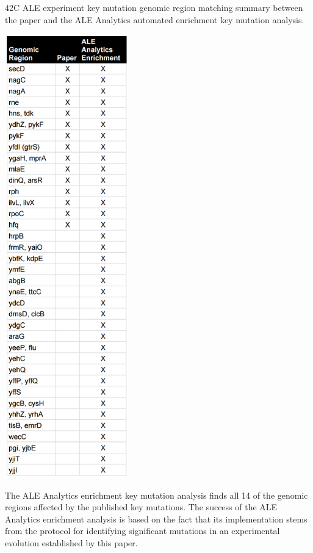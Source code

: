 \documentclass[12pt,final,masters,chapterheads]{ucsd}  %
\begin{document}
\begin{table}[H]
  \caption{42C ALE experiment {key mutation} genomic region matching summary between the paper and the ALE Analytics automated {enrichment key mutation} analysis.}
  \centering
  \includegraphics[width=0.4\textwidth]{42c_key_mutation_regions.png}
\end{table}
The ALE Analytics enrichment key mutation analysis finds all 14 of the genomic regions affected by the published key mutations. The success of the ALE Analytics enrichment analysis is based on the fact that its implementation stems from the protocol for identifying significant mutations in an experimental evolution established by this paper.
\end{document}
